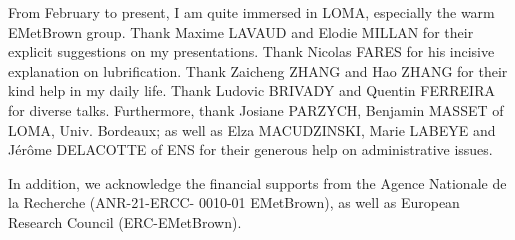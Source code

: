 \documentclass[fleqn,10pt]{InternshipReport-ENS-PSL}
\begin{document}
From February to present, I am quite immersed in LOMA, especially the warm EMetBrown group. Thank Maxime LAVAUD and Elodie MILLAN for their explicit suggestions on my presentations. Thank Nicolas FARES for his incisive explanation on lubrification. Thank Zaicheng ZHANG and Hao ZHANG for their kind help in my daily life. Thank Ludovic BRIVADY and Quentin FERREIRA for diverse talks. Furthermore, thank Josiane PARZYCH, Benjamin MASSET of LOMA, Univ. Bordeaux; as well as Elza MACUDZINSKI, Marie LABEYE and Jérôme DELACOTTE of ENS for their generous help on administrative issues. 

In addition, we acknowledge the financial supports from the Agence Nationale de la Recherche (ANR-21-ERCC-
0010-01 EMetBrown), as well as European Research Council (ERC-EMetBrown).






\end{document}
